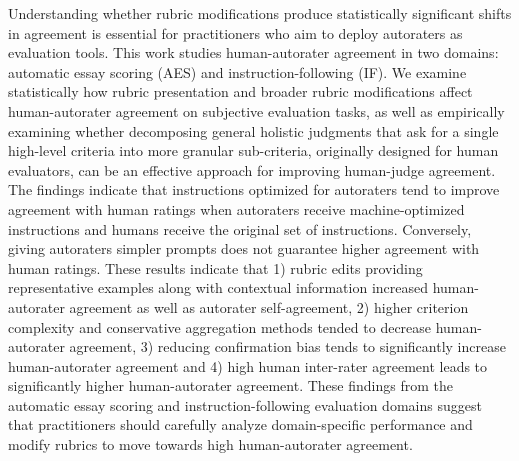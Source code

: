 Understanding whether rubric modifications produce statistically significant shifts in agreement is essential for practitioners who aim to deploy autoraters as evaluation tools. This work studies human-autorater agreement in two domains: automatic essay scoring (AES) and instruction-following (IF). We examine statistically how rubric presentation and broader rubric modifications affect human-autorater agreement on subjective evaluation tasks, as well as empirically examining whether decomposing general holistic judgments that ask for a single high-level criteria into more granular sub-criteria, originally designed for human evaluators, can be an effective approach for improving human-judge agreement. The findings indicate that instructions optimized for autoraters tend to improve agreement with human ratings when autoraters receive machine-optimized instructions and humans receive the original set of instructions.
Conversely, giving autoraters simpler prompts does not guarantee higher agreement with human ratings.
These results indicate that 1) rubric edits providing representative examples along with contextual information increased human-autorater agreement as well as autorater self-agreement, 2) higher criterion complexity and conservative aggregation methods tended to decrease human-autorater agreement, 3) reducing confirmation bias tends to significantly increase human-autorater agreement and 4) high human inter-rater agreement leads to significantly higher human-autorater agreement.
These findings from the automatic essay scoring and instruction-following evaluation domains suggest that practitioners should carefully analyze domain-specific performance and modify rubrics to move towards high human-autorater agreement. 
